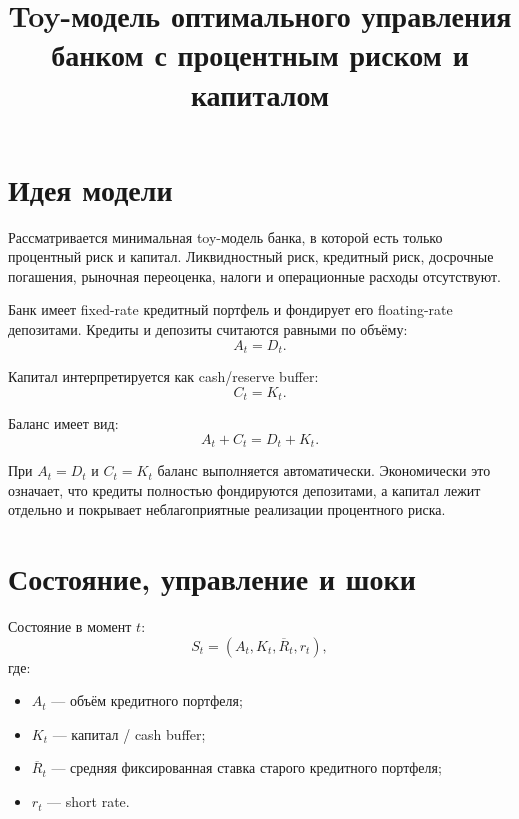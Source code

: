 \documentclass[11pt,a4paper]{article}
\title{Toy-модель оптимального управления банком с процентным риском и капиталом}
\author{}
\date{}
\newcommand{\1}{\mathbf{1}}
\begin{document}
\maketitle

\section{Идея модели}

Рассматривается минимальная toy-модель банка, в которой есть только процентный риск и капитал. Ликвидностный риск, кредитный риск, досрочные погашения, рыночная переоценка, налоги и операционные расходы отсутствуют.

Банк имеет fixed-rate кредитный портфель и фондирует его floating-rate депозитами. Кредиты и депозиты считаются равными по объёму:
\begin{equation}
    A_t = D_t.
\end{equation}

Капитал интерпретируется как cash/reserve buffer:
\begin{equation}
    C_t = K_t.
\end{equation}

Баланс имеет вид:
\begin{equation}
    A_t + C_t = D_t + K_t.
\end{equation}

При $A_t=D_t$ и $C_t=K_t$ баланс выполняется автоматически. Экономически это означает, что кредиты полностью фондируются депозитами, а капитал лежит отдельно и покрывает неблагоприятные реализации процентного риска.

\section{Состояние, управление и шоки}

Состояние в момент $t$:
\begin{equation}
    S_t = (A_t, K_t, \overline{R}_t, r_t),
\end{equation}
где:
\begin{itemize}[noitemsep]
    \item $A_t$ --- объём кредитного портфеля;
    \item $K_t$ --- капитал / cash buffer;
    \item $\overline{R}_t$ --- средняя фиксированная ставка старого кредитного портфеля;
    \item $r_t$ --- short rate.
\end{itemize}
\end{document}
